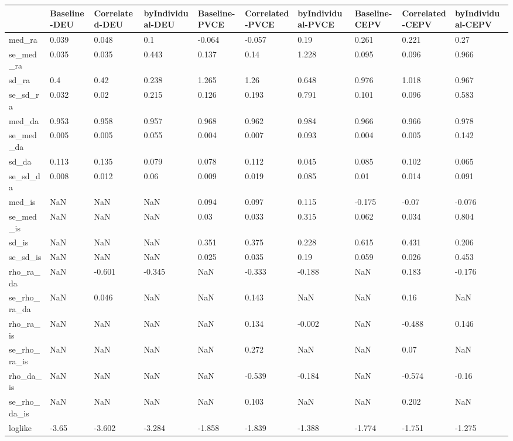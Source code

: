 \begin{tabular}{llllllllll}
& Baseline-DEU & Correlated-DEU & byIndividual-DEU & Baseline-PVCE & Correlated-PVCE & byIndividual-PVCE & Baseline-CEPV & Correlated-CEPV & byIndividual-CEPV \\ 
\hline 
med_ra & 0.039 & 0.048 & 0.1 & -0.064 & -0.057 & 0.19 & 0.261 & 0.221 & 0.27 \\ 
se_med_ra & 0.035 & 0.035 & 0.443 & 0.137 & 0.14 & 1.228 & 0.095 & 0.096 & 0.966 \\ 
sd_ra & 0.4 & 0.42 & 0.238 & 1.265 & 1.26 & 0.648 & 0.976 & 1.018 & 0.967 \\ 
se_sd_ra & 0.032 & 0.02 & 0.215 & 0.126 & 0.193 & 0.791 & 0.101 & 0.096 & 0.583 \\ 
med_da & 0.953 & 0.958 & 0.957 & 0.968 & 0.962 & 0.984 & 0.966 & 0.966 & 0.978 \\ 
se_med_da & 0.005 & 0.005 & 0.055 & 0.004 & 0.007 & 0.093 & 0.004 & 0.005 & 0.142 \\ 
sd_da & 0.113 & 0.135 & 0.079 & 0.078 & 0.112 & 0.045 & 0.085 & 0.102 & 0.065 \\ 
se_sd_da & 0.008 & 0.012 & 0.06 & 0.009 & 0.019 & 0.085 & 0.01 & 0.014 & 0.091 \\ 
med_is & NaN & NaN & NaN & 0.094 & 0.097 & 0.115 & -0.175 & -0.07 & -0.076 \\ 
se_med_is & NaN & NaN & NaN & 0.03 & 0.033 & 0.315 & 0.062 & 0.034 & 0.804 \\ 
sd_is & NaN & NaN & NaN & 0.351 & 0.375 & 0.228 & 0.615 & 0.431 & 0.206 \\ 
se_sd_is & NaN & NaN & NaN & 0.025 & 0.035 & 0.19 & 0.059 & 0.026 & 0.453 \\ 
rho_ra_da & NaN & -0.601 & -0.345 & NaN & -0.333 & -0.188 & NaN & 0.183 & -0.176 \\ 
se_rho_ra_da & NaN & 0.046 & NaN & NaN & 0.143 & NaN & NaN & 0.16 & NaN \\ 
rho_ra_is & NaN & NaN & NaN & NaN & 0.134 & -0.002 & NaN & -0.488 & 0.146 \\ 
se_rho_ra_is & NaN & NaN & NaN & NaN & 0.272 & NaN & NaN & 0.07 & NaN \\ 
rho_da_is & NaN & NaN & NaN & NaN & -0.539 & -0.184 & NaN & -0.574 & -0.16 \\ 
se_rho_da_is & NaN & NaN & NaN & NaN & 0.103 & NaN & NaN & 0.202 & NaN \\ 
loglike & -3.65 & -3.602 & -3.284 & -1.858 & -1.839 & -1.388 & -1.774 & -1.751 & -1.275 \\ 
\hline 
\end{tabular}
